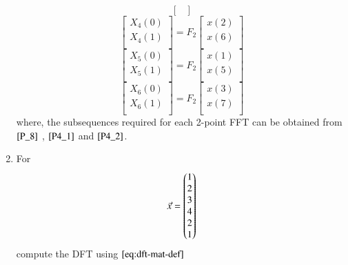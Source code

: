 \documentclass[journal,12pt,twocolumn]{IEEEtran}
\renewcommand\thesection{\arabic{section}}
\begin{document}
\begin{enumerate}[label=\arabic*.,ref=\thesection.\theenumi]
\begin{equation}
\begin{bmatrix}
      \end{bmatrix}
    \end{equation}
    \begin{equation}
      \begin{bmatrix}
        X_{4}(0) \\ 
        X_{4}(1)\\ 
      \end{bmatrix}
      = F_{2}
      \begin{bmatrix}
        x(2) \\ 
        x(6) \\ 
      \end{bmatrix}
    \end{equation}
    \begin{equation}
      \begin{bmatrix}
        X_{5}(0) \\ 
        X_{5}(1)\\ 
      \end{bmatrix}
      = F_{2}
      \begin{bmatrix}
        x(1) \\ 
        x(5) \\ 
      \end{bmatrix}
    \end{equation}
    \begin{equation}
      \begin{bmatrix}
        X_{6}(0) \\ 
        X_{6}(1)\\ 
      \end{bmatrix}
      = F_{2}
      \begin{bmatrix}
        x(3) \\ 
        x(7) \\ 
      \end{bmatrix}
      \end{equation}
    where, the subsequences required for each 2-point FFT can be obtained from $\eqref{P_8}$ , $\eqref{P4_1}$ and $\eqref{P4_2}$.
    \item For 
        \begin{align}
          \vec{x} = \begin{pmatrix}1\\2\\3\\4\\2\\1\end{pmatrix}
            \label{eq:equation1}
        \end{align}
        compute the DFT  
        using 
          $\eqref{eq:dft-mat-def}$\\

\end{enumerate}
\end{document}
